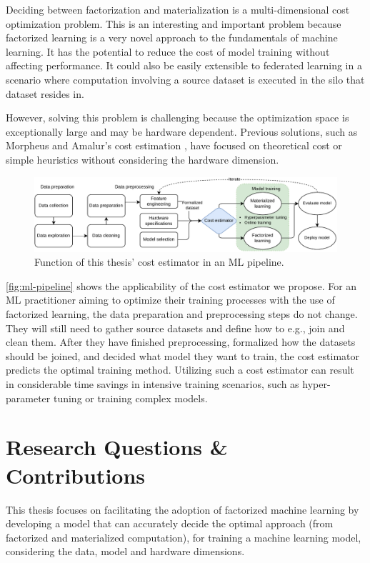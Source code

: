 Deciding between factorization and materialization is a multi-dimensional cost optimization problem. This is an interesting and important problem because factorized learning is a very novel approach to the fundamentals of machine learning. It has the potential to reduce the cost of model training without affecting performance. It could also be easily extensible to federated learning in a scenario where computation involving a source dataset is executed in the silo that dataset resides in.

However, solving this problem is challenging because the optimization space is exceptionally large and may be hardware dependent. Previous solutions, such as Morpheus \cite{morpheus} and Amalur's cost estimation \cite{schijndel_cost_estimation}, have focused on theoretical cost or simple heuristics without considering the hardware dimension.

\begin{figure}[h]
    \centering
    \includegraphics[width=0.95\linewidth]{chapters/01_introduction/figures/ML-Pipeline.pdf}
    \caption{Function of this thesis' cost estimator in an ML pipeline.}
    \label{fig:ml-pipeline}
\end{figure}

\autoref{fig:ml-pipeline} shows the applicability of the cost estimator we propose. For an ML practitioner aiming to optimize their training processes with the use of factorized learning, the data preparation and preprocessing steps do not change. They will still need to gather source datasets and define how to e.g., join and clean them. After they have finished preprocessing, formalized how the datasets should be joined, and decided what model they want to train, the cost estimator predicts the optimal training method. Utilizing such a cost estimator can result in considerable time savings in intensive training scenarios, such as hyper-parameter tuning or training complex models.


\section{Research Questions \& Contributions}
This thesis focuses on facilitating the adoption of factorized machine learning by developing a model that can accurately decide the optimal approach (from factorized and materialized computation), for training a machine learning model, considering the data, model and hardware dimensions.

